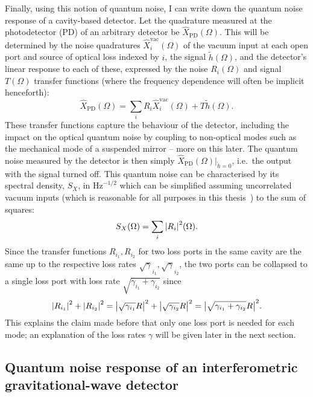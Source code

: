 Finally, using this notion of quantum noise, I can write down the quantum noise response of a cavity-based detector. %
Let the quadrature measured at the photodetector (PD) of an arbitrary detector be $\hat{X}_\text{PD}(\Omega)$. This will be determined by the noise quadratures $\hat{X}_i^\text{vac}(\Omega)$ of the vacuum input at each open port and source of optical loss indexed by $i$, the signal $\tilde{h}(\Omega)$, and the detector's linear response to each of these, expressed by the noise $R_i(\Omega)$ and signal $T(\Omega)$ transfer functions (where the frequency dependence will often be implicit henceforth): $$\hat X_\text{PD}(\Omega)=\sum_i R_i \hat X_i^\text{vac}(\Omega) + T \tilde h(\Omega).$$
These transfer functions capture the behaviour of the detector, including the impact on the optical quantum noise by coupling to non-optical modes such as the mechanical mode of a suspended mirror -- more on this later. 
The quantum noise measured by the detector is then simply $\hat X_\text{PD}(\Omega)|_{\tilde h=0}$, i.e.\ the output with the signal turned off. This quantum noise can be characterised by its spectral density, $S_X$, in $\text{Hz}^{-1/2}$ which can be simplified assuming uncorrelated vacuum inputs (which is reasonable for all purposes in this thesis~\cite{}) to the sum of squares: $$S_X(\Omega)=\sum_i \abs{R_i}^2(\Omega).$$ 
Since the transfer functions $R_{i_1}, R_{i_2}$ for two loss ports in the same cavity are the same up to the respective loss rates $\sqrt\gamma_{i_1}, \sqrt\gamma_{i_2}$, the two ports can be collapsed to a single loss port with loss rate $\sqrt{\gamma_{i_1}+\gamma_{i_2}}$ since $$\abs{R_{i_1}}^2+\abs{R_{i_2}}^2=\abs{\sqrt{\gamma_{i_1}}R}^2+\abs{\sqrt{\gamma_{i_2}}R}^2=\abs{\sqrt{\gamma_{i_1}+\gamma_{i_2}}R}^2.$$ This explains the claim made before that only one loss port is needed for each mode; an explanation of the loss rates $\gamma$ will be given later in the next section.



\subsection{Quantum noise response of an interferometric gravitational-wave detector}


